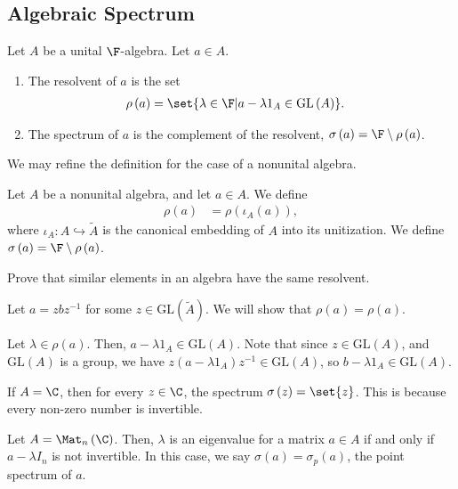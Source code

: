 \documentclass[10pt]{mypackage}
\newcommand{\GL}{\text{GL}}
\begin{document}
\subsection{Algebraic Spectrum}%
\begin{definition}
  Let $A$ be a unital $\F$-algebra. Let $a\in A$.
  \begin{enumerate}[(1)]
    \item The resolvent of $a$ is the set
      \begin{align*}
        \rho\left(a\right) &= \set{\lambda\in\F | a-\lambda 1_A \in \GL\left(A\right)}.
      \end{align*}
    \item The spectrum of $a$ is the complement of the resolvent, $\sigma\left(a\right) = \F\setminus \rho\left(a\right)$.
  \end{enumerate}
\end{definition}
We may refine the definition for the case of a nonunital algebra.
\begin{definition}
  Let $A$ be a nonunital algebra, and let $a\in A$. We define
  \begin{align*}
    \rho\left(a\right) &= \rho\left(\iota_A\left(a\right)\right),
  \end{align*}
  where $\iota_A\colon A\hookrightarrow \widetilde{A}$ is the canonical embedding of $A$ into its unitization. We define $\sigma\left(a\right) = \F\setminus \rho\left(a\right)$.
\end{definition}
\begin{exercise}
  Prove that similar elements in an algebra have the same resolvent.
\end{exercise}
\begin{solution}
  Let $a = zbz^{-1}$ for some $z\in \GL\left(\widetilde{A}\right)$. We will show that $\rho\left(a\right) = \rho\left(a\right)$.\newline

  Let $\lambda\in \rho\left(a\right)$. Then, $a - \lambda 1_A \in \GL\left(A\right)$. Note that since $z\in \GL\left(A\right)$, and $\GL\left(A\right)$ is a group, we have $z\left(a-\lambda 1_A\right) z^{-1}\in \GL\left(A\right)$, so $b - \lambda 1_A\in \GL\left(A\right)$.
\end{solution}
\begin{example}
  If $A = \C$, then for every $z\in \C$, the spectrum $\sigma\left(z \right) = \set{z}$. This is because every non-zero number is invertible.
\end{example}
\begin{example}
  Let $A = \Mat_n\left(\C\right)$. Then, $\lambda$ is an eigenvalue for a matrix $a\in A$ if and only if $a - \lambda I_n$ is not invertible. In this case, we say $\sigma\left(a\right) = \sigma_p\left(a\right)$, the point spectrum of $a$.
\end{example}
\end{document}
